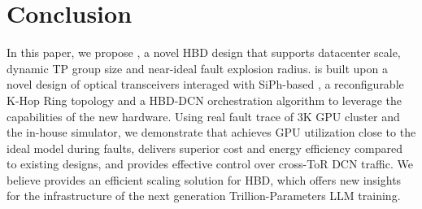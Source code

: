 
\section{Conclusion}

In this paper, we propose \sys{}, a novel HBD design that supports datacenter scale, dynamic TP group size and near-ideal fault explosion radius.
\sys is built upon a novel design of optical transceivers interaged with SiPh-based \ocstrx, a reconfigurable K-Hop Ring topology and a HBD-DCN orchestration algorithm to leverage the capabilities of the new hardware. 
Using real fault trace of 3K GPU cluster and the in-house simulator, we demonstrate that \sys{} achieves GPU utilization close to the ideal model during faults, delivers superior cost and energy efficiency compared to existing designs, and provides effective control over cross-ToR DCN traffic.
We believe \sys provides an efficient scaling solution for HBD, which offers new insights for the infrastructure of the next generation Trillion-Parameters LLM training.

\clearpage